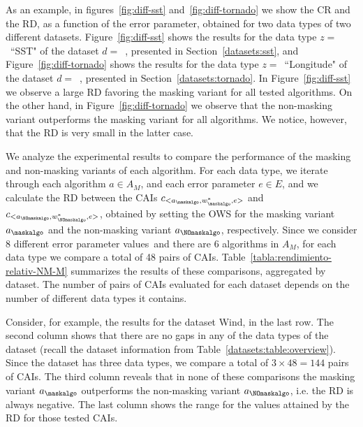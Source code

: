 \vspace{+2pt}
As an example, in figures~\ref{fig:diff-sst} and~\ref{fig:diff-tornado} we show the CR and the RD, as a function of the error parameter, obtained for two data types of two different datasets. Figure~\ref{fig:diff-sst} shows the results for the data type $z=$~``SST" of the dataset $d=$~\datasetsst, presented in Section~\ref{datasets:sst}, and Figure~\ref{fig:diff-tornado} shows the results for the data type $z=$~``Longitude" of the dataset $d=$~\datasettornado, presented in Section~\ref{datasets:tornado}. In Figure~\ref{fig:diff-sst} we observe a large RD favoring the masking variant for all tested algorithms. On the other hand, in Figure~\ref{fig:diff-tornado} we observe that the non-masking variant outperforms the masking variant for all algorithms. We notice, however, that the RD is very small in the latter case.


\clearpage



\clearpage


\newcommand{\errParVal}{8 different error parameter values}
We analyze the experimental results to compare the performance of the masking and non-masking variants of each algorithm. For each data type, we iterate through each algorithm $a \in A_M$, and each error parameter $e \in E$, and we calculate the RD between the CAIs $c_{<a_\maskalgo, w_\maskalgo^{*}, e>}$ and $c_{<a_\NOmaskalgo, w_\NOmaskalgo^{*}, e>}$, obtained by setting the OWS for the masking variant $a_\maskalgo$ and the non-masking variant $a_\NOmaskalgo$, respectively. Since we consider \errParVal\ and there are 6 algorithms in $A_M$, for each data type we compare a total of 48 pairs of CAIs. Table~\ref{tabla:rendimiento-relativ-NM-M} summarizes the results of these comparisons, aggregated by dataset. The number of pairs of CAIs evaluated for each dataset depends on the number of different data types it contains.


\vspace{+5pt}

\vspace{-5pt}


Consider, for example, the results for the dataset Wind, in the last row. The second column shows that there are no gaps in any of the data types of the dataset (recall the dataset information from Table~\ref{datasets:table:overview}). Since the dataset has three data types, we compare a total of $3\times48=144$ pairs of CAIs. The third column reveals that in none of these comparisons the masking variant $a_\maskalgo$ outperforms the non-masking variant $a_\NOmaskalgo$, i.e. the RD is always negative. The last column shows the range for the values attained by the RD for those tested CAIs.



